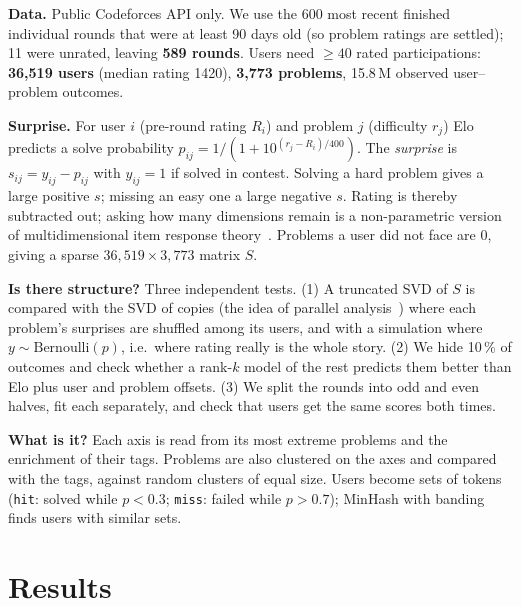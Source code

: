 \documentclass[conference]{IEEEtran}
\begin{document}
\textbf{Data.} Public Codeforces API only. We use the 600 most recent finished individual rounds that were at least 90 days old (so problem ratings are settled); 11 were unrated, leaving \textbf{589 rounds}. Users need $\ge40$ rated participations: \textbf{36,519 users} (median rating 1420), \textbf{3,773 problems}, 15.8\,M observed user--problem outcomes.

\textbf{Surprise.} For user $i$ (pre-round rating $R_i$) and problem $j$ (difficulty $r_j$) Elo~\cite{elo} predicts a solve probability $p_{ij}=1/(1+10^{(r_j-R_i)/400})$. The \emph{surprise} is $s_{ij}=y_{ij}-p_{ij}$ with $y_{ij}=1$ if solved in contest. Solving a hard problem gives a large positive $s$; missing an easy one a large negative $s$. Rating is thereby subtracted out; asking how many dimensions remain is a non-parametric version of multidimensional item response theory~\cite{rasch,mirt}. Problems a user did not face are 0, giving a sparse $36{,}519\times3{,}773$ matrix $S$.

\textbf{Is there structure?} Three independent tests. (1) A truncated SVD of $S$ is compared with the SVD of copies (the idea of parallel analysis~\cite{horn}) where each problem's surprises are shuffled among its users, and with a simulation where $y\sim\mathrm{Bernoulli}(p)$, i.e.\ where rating really is the whole story. (2) We hide 10\,\% of outcomes and check whether a rank-$k$ model of the rest predicts them better than Elo plus user and problem offsets. (3) We split the rounds into odd and even halves, fit each separately, and check that users get the same scores both times.

\textbf{What is it?} Each axis is read from its most extreme problems and the enrichment of their tags. Problems are also clustered on the axes and compared with the tags, against random clusters of equal size. Users become sets of tokens (\texttt{hit}: solved while $p<0.3$; \texttt{miss}: failed while $p>0.7$); MinHash with banding~\cite{broder,mmds} finds users with similar sets.

\section{Results}
\end{document}
